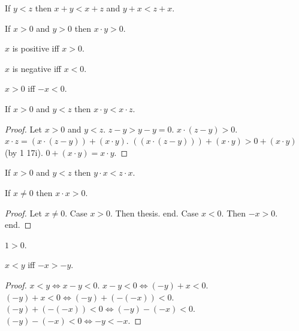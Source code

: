 \documentclass{article}
\begin{document}
\begin{forthel}

\begin{axiom}[1 17 i] If $y < z$ then $x + y < x + z$ and $y + x < z + x$.
\end{axiom}

\begin{axiom}[1 17 ii] If $x > 0$ and $y > 0$ then $x \cdot y > 0$.
\end{axiom}

\begin{definition} $x$ is positive iff $x > 0$.
\end{definition}

\begin{definition} $x$ is negative iff $x < 0$.
\end{definition}


\begin{proposition}[1 18 a] $x > 0$ iff $-x < 0$. \end{proposition}

\begin{proposition}[1 18 b] If $x > 0$ and $y < z$ then 
$x \cdot y < x \cdot z$.
\end{proposition}
\begin{proof} Let $x > 0$ and $y < z$.
$z - y > y - y = 0$.
$x \cdot (z - y) > 0$.
$x \cdot z = (x \cdot (z - y)) + (x \cdot y)$.
$((x \cdot (z - y))) + (x \cdot y)  > 0 + (x \cdot y)$ (by 1 17i).
$0 + (x \cdot y) = x \cdot y$.
\end{proof}

\begin{proposition}[1 18 bb] If $x > 0$ and $y < z$ then 
$y \cdot x < z \cdot x$.
\end{proposition}


\begin{proposition}[1 18 d] If $x \neq 0$ then $x \cdot x > 0$.
\end{proposition}
\begin{proof}
Let $x \neq 0$.
Case $x > 0$. Then thesis. end.
Case $x < 0$. Then $ -x > 0$. 
end. 
\end{proof}
\begin{proposition}[1 18 dd] $1 > 0$.\end{proposition}

\begin{proposition} $x < y$ iff $-x > -y$.\end{proposition}
\begin{proof}
$x < y \iff x - y < 0$. 
$x - y < 0 \iff (-y) + x < 0$. 
$(-y) + x < 0 \iff (-y)+(-(-x)) < 0$.
$(-y)+(-(-x)) < 0 \iff (-y)-(-x) < 0$.
$(-y)-(-x) < 0 \iff -y < -x$.
\end{proof}


\end{forthel}
\end{document}
